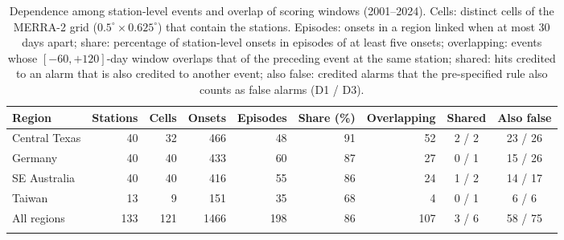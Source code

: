 \begin{table}[tbp]
\caption{Dependence among station-level events and overlap of scoring windows (2001--2024). Cells: distinct
cells of the MERRA-2 grid ($0.5^\circ\times0.625^\circ$) that contain the stations. Episodes: onsets
in a region linked when at most 30 days apart; share: percentage of station-level onsets in episodes of at
least five onsets; overlapping: events whose $[-60,+120]$-day window overlaps that of the preceding event at
the same station; shared: hits credited to an alarm that is also credited to another event; also false:
credited alarms that the pre-specified rule also counts as false alarms (D1 / D3).}
\label{tab:episodes}
\footnotesize\setlength{\tabcolsep}{3pt}
\begin{tabular*}{\textwidth}{@{\extracolsep\fill}lrrrrrrcc}
\toprule
Region & Stations & Cells & Onsets & Episodes & Share (\%) & Overlapping & Shared & Also false\\
\midrule
Central Texas & 40 & 32 & 466 & 48 & 91 & 52 & 2 / 2 & 23 / 26 \\
Germany & 40 & 40 & 433 & 60 & 87 & 27 & 0 / 1 & 15 / 26 \\
SE Australia & 40 & 40 & 416 & 55 & 86 & 24 & 1 / 2 & 14 / 17 \\
Taiwan & 13 & 9 & 151 & 35 & 68 & 4 & 0 / 1 & 6 / 6 \\
All regions & 133 & 121 & 1466 & 198 & 86 & 107 & 3 / 6 & 58 / 75 \\
\botrule
\end{tabular*}
\end{table}
